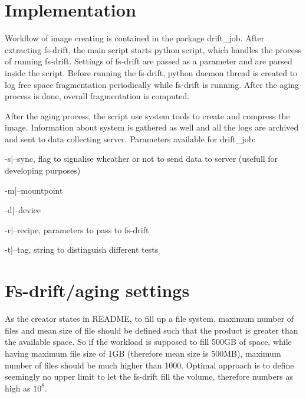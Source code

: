 \documentclass[
  color, %
  table, %
  lof,   %
  lot,   %
]{fithesis3}
\begin{document}


\section{Implementation}
Workflow of image creating is contained in the package drift\_job. After extracting fs-drift, the main script starts python script, which handles the process of running fs-drift. Settings of fs-drift are passed as a parameter and are parsed inside the script. Before running the fs-drift, python daemon thread is created to log free space fragmentation periodically while fs-drift is running. After the aging process is done, overall fragmentation is computed.

After the aging process, the script use system tools to create and compress the image. Information about system is gathered as well and all the logs are archived and sent to data collecting server.
Parameters available for drift\_job:
\begin{compactenum}
  \item -s|--sync, flag to signalise wheather or not to send data to server (usefull for developing purposes)
  \item -m|--mountpoint
  \item -d|--device
  \item -r|--recipe, parameters to pass to fs-drift
  \item -t|--tag, string to distinguish different tests
  \end{compactenum}

\section{Fs-drift/aging settings}
As the creator states in README, to fill up a file system, maximum number of files and mean size of file should be defined such that the product is greater than the available space. So if the workload is supposed to fill 500GB of space, while having maximum file size of 1GB (therefore mean size is 500MB), maximum number of files should be much higher than 1000. Optimal approach is to define seemingly no upper limit to let the fs-drift fill the volume, therefore numbers as high as $10^8$.
\end{document}
